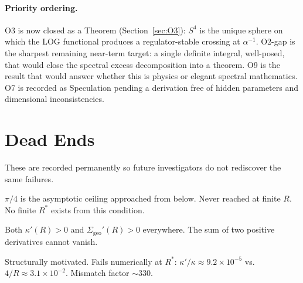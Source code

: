 \documentclass[12pt,a4paper]{article}
\newcommand{\Sg}{\Sigma_{\mathrm{geo}}}
\newcommand{\kap}{\kappa}
\begin{document}
\paragraph{Priority ordering.}
O3 is now closed as a Theorem (Section~\ref{sec:O3}):
$S^4$ is the unique sphere on which the LOG functional
produces a regulator-stable crossing at $\alpha^{-1}$.
O2-gap is the sharpest remaining near-term target:
a single definite integral, well-posed,
that would close the spectral excess decomposition
into a theorem.
O9 is the result that would answer whether
this is physics or elegant spectral mathematics.
O7 is recorded as Speculation pending a derivation
free of hidden parameters and dimensional inconsistencies.

\section{Dead Ends}
\label{sec:deadends}

These are recorded permanently so future investigators
do not rediscover the same failures.

\begin{Dbox}[$\kap(R) = \pi/4$ as fixed-point condition]
$\pi/4$ is the asymptotic ceiling approached from below.
Never reached at finite $R$.
No finite $R^*$ exists from this condition.
\end{Dbox}

\begin{Dbox}[$d(\kap + \Sg)/dR = 0$]
Both $\kap'(R) > 0$ and $\Sg'(R) > 0$ everywhere.
The sum of two positive derivatives cannot vanish.
\end{Dbox}

\begin{Dbox}[$\kap'/\kap = 4/R$ (ratio saddle)]
Structurally motivated.
Fails numerically at $R^*$:
$\kap'/\kap \approx 9.2 \times 10^{-5}$
vs.\ $4/R \approx 3.1 \times 10^{-2}$.
Mismatch factor $\sim 330$.
\end{Dbox}
\end{document}
